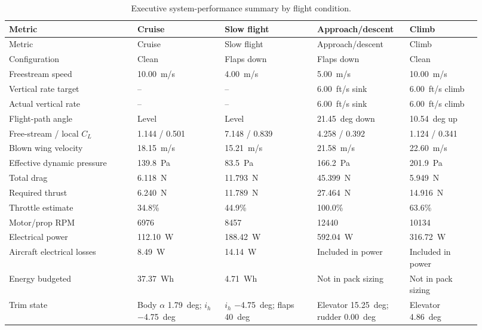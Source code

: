 \documentclass[11pt]{article}
\begin{document}
\begin{longtable}{@{}p{0.25\linewidth}p{0.17\linewidth}p{0.18\linewidth}p{0.18\linewidth}p{0.14\linewidth}@{}}
\caption{Executive system-performance summary by flight condition.}\label{tab:exec-performance}\\
\toprule
Metric & Cruise & Slow flight & Approach/descent & Climb \\
\midrule
\endfirsthead
\toprule
Metric & Cruise & Slow flight & Approach/descent & Climb \\
\midrule
\endhead
Configuration & Clean & Flaps down & Flaps down & Clean \\
Freestream speed & \SI{10.00}{m/s} & \SI{4.00}{m/s} & \SI{5.00}{m/s} & \SI{10.00}{m/s} \\
Vertical rate target & -- & -- & \SI{6.00}{ft/s} sink & \SI{6.00}{ft/s} climb \\
Actual vertical rate & -- & -- & \SI{6.00}{ft/s} sink & \SI{6.00}{ft/s} climb \\
Flight-path angle & Level & Level & \SI{21.45}{deg} down & \SI{10.54}{deg} up \\
Free-stream / local \(C_L\) & 1.144 / 0.501 & 7.148 / 0.839 & 4.258 / 0.392 & 1.124 / 0.341 \\
Blown wing velocity & \SI{18.15}{m/s} & \SI{15.21}{m/s} & \SI{21.58}{m/s} & \SI{22.60}{m/s} \\
Effective dynamic pressure & \SI{139.8}{Pa} & \SI{83.5}{Pa} & \SI{166.2}{Pa} & \SI{201.9}{Pa} \\
Total drag & \SI{6.118}{N} & \SI{11.793}{N} & \SI{45.399}{N} & \SI{5.949}{N} \\
Required thrust & \SI{6.240}{N} & \SI{11.789}{N} & \SI{27.464}{N} & \SI{14.916}{N} \\
Throttle estimate & 34.8\% & 44.9\% & 100.0\% & 63.6\% \\
Motor/prop RPM & \num{6976} & \num{8457} & \num{12440} & \num{10134} \\
Electrical power & \SI{112.10}{W} & \SI{188.42}{W} & \SI{592.04}{W} & \SI{316.72}{W} \\
Aircraft electrical losses & \SI{8.49}{W} & \SI{14.14}{W} & Included in power & Included in power \\
Energy budgeted & \SI{37.37}{Wh} & \SI{4.71}{Wh} & Not in pack sizing & Not in pack sizing \\
Trim state & Body \(\alpha\) \SI{1.79}{deg}; \(i_h\) \SI{-4.75}{deg} & \(i_h\) \SI{-4.75}{deg}; flaps \SI{40}{deg} & Elevator \SI{15.25}{deg}; rudder \SI{0.00}{deg} & Elevator \SI{4.86}{deg} \\
\bottomrule
\end{longtable}
\end{document}
